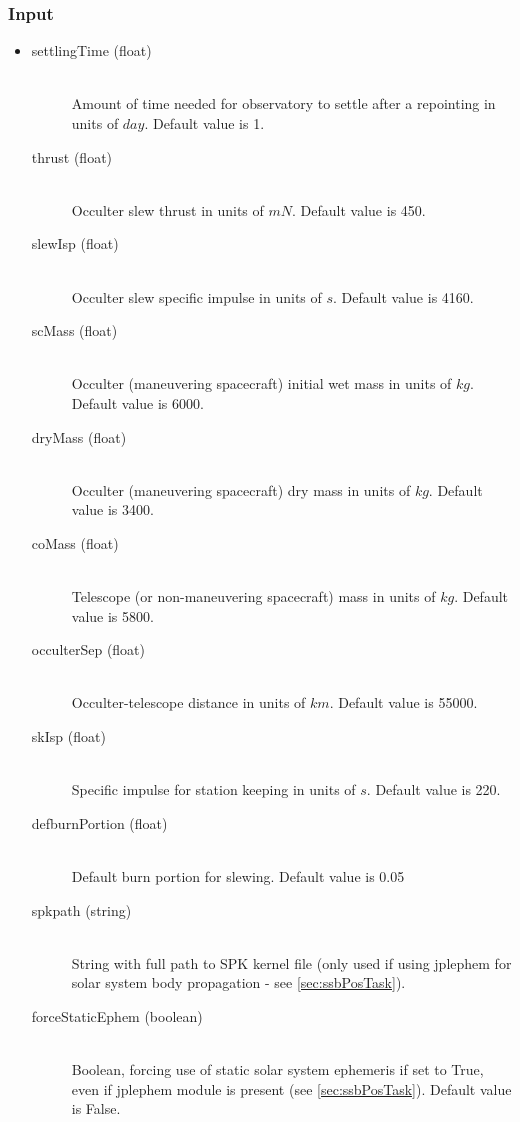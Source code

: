 \documentclass[cleanfoot]{asme2ej}
\begin{document}
\subsubsection*{Input}
\begin{itemize}
\item
\begin{description}
    \item[settlingTime (float)] \hfill \\ Amount of time needed for observatory to settle after a repointing in units of $ day $. Default value is 1.
    \item[thrust (float)] \hfill \\ Occulter slew thrust in units of $ mN $. Default value is 450.
    \item[slewIsp (float)] \hfill \\ Occulter slew specific impulse in units of $ s $. Default value is 4160.
    \item[scMass (float)] \hfill \\ Occulter (maneuvering spacecraft) initial wet mass in units of $ kg $. Default value is 6000.
    \item[dryMass (float)] \hfill \\ Occulter (maneuvering spacecraft) dry mass in units of $ kg $. Default value is 3400.
    \item[coMass (float)] \hfill \\ Telescope (or non-maneuvering spacecraft) mass in units of $ kg $. Default value is 5800.
    \item[occulterSep (float)] \hfill \\ Occulter-telescope distance in units of $ km $. Default value is 55000.
    \item[skIsp (float)] \hfill \\ Specific impulse for station keeping in units of $ s $. Default value is 220.
    \item[defburnPortion (float)] \hfill \\ Default burn portion for slewing. Default value is 0.05
    \item[spkpath (string)] \hfill\\ String with full path to SPK kernel file (only used if using jplephem for solar system body propagation - see \ref{sec:ssbPosTask}).
    \item[forceStaticEphem (boolean)] \hfill \\ Boolean, forcing use of static solar system ephemeris if set to True, even if jplephem module is present (see \ref{sec:ssbPosTask}).  Default value is False.
\end{description}
\end{itemize}
\end{document}
